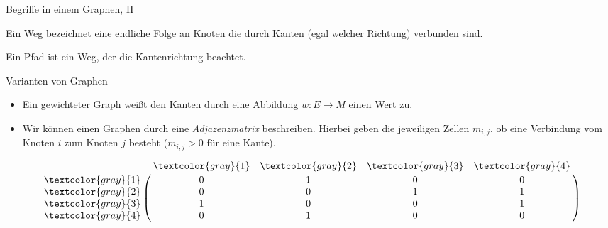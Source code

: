 \begin{frame}{Begriffe in einem Graphen, II}
    \pause{}
    \begin{description}[Pfad]
        \widei
        \item[Weg] Ein Weg bezeichnet eine endliche Folge an Knoten die durch Kanten (egal welcher Richtung) verbunden sind.\par\medskip\pause{}
\begin{center}
\end{center}
        \item[Pfad] Ein Pfad ist ein Weg, der die Kantenrichtung beachtet.
    \end{description}
\end{frame}

\begin{frame}{Varianten von Graphen}
    \begin{itemize}[<+(1)->]
        \widei
        \item Ein gewichteter Graph weißt den Kanten durch eine Abbildung \(w: E \to M\) einen Wert zu.
        \item Wir können einen Graphen durch eine \emph{Adjazenzmatrix} beschreiben.\pause{} Hierbei geben die jeweiligen Zellen \(m_{i,j}\), ob eine Verbindung vom Knoten \(i\) zum Knoten \(j\) besteht (\(m_{i, j} > 0\) für eine Kante).
    \end{itemize}
    \vfill\pause{}
    \begin{minipage}{0.45\linewidth}
\centering{}
    \end{minipage}\quad\begin{minipage}{0.45\linewidth}%
        \[\bordermatrix{~ & \textcolor{gray}{1} & \textcolor{gray}{2} & \textcolor{gray}{3} & \textcolor{gray}{4} \cr
        \textcolor{gray}{1} & 0 & 1 & 0 & 0\cr
        \textcolor{gray}{2} & 0 & 0 & 1 & 1\cr
        \textcolor{gray}{3} & 1 & 0 & 0 & 1\cr
        \textcolor{gray}{4} & 0 & 1 & 0 & 0\cr
        }\]
    \end{minipage}
\end{frame}


